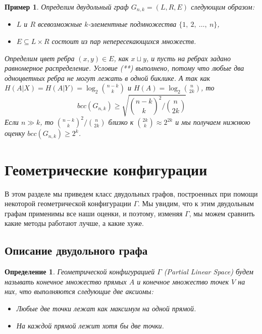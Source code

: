 \documentclass[a4paper]{article}
\newtheorem*{mdefinition}{Определение}
\newtheorem*{mexample}{Пример}
\begin{document}
\begin{mexample}
    Определим двудольный граф $G_{n,k} = (L, R, E)$ следующим образом: 
    \begin{itemize}[noitemsep]
        \item $L$ и $R$ всевозможные $k$-элементные подмножества $\{1,\ 2,\ \ldots,\ n\}$,
        \item $E\subseteq L\times R$ состоит из пар непересекающихся множеств.
    \end{itemize}
    Определим цвет ребра $(x, y)\in E$, как $x\sqcup y$, и пусть на ребрах задано равномерное распределение.
    Условие (**) выполнено, потому что любые два одноцветных ребра не могут лежать в одной биклике. А так как 
    $H(A|X) = H(A|Y) = \log_2\binom{n-k}{k}$ и $H(A) = \log_2\binom{n}{2k}$, то $$bcc(G_{n,k}) \geq 
    \sqrt{\binom{n-k}{k}^2 / \binom{n}{2k}}$$
    Если $n \gg k$, то $\binom{n-k}{k}^2 / \binom{n}{2k}$ близко к $\binom{2k}{k}\approx 2^{2k}$ и мы 
    получаем нижнюю оценку $bcc(G_{n,k})\geq 2^k$.
\end{mexample}

\setcounter{mclaim}{0}
\setcounter{mlemma}{0}
\setcounter{mtheorem}{0}
\addtocounter{section}{1}
\section*{Геометрические конфигурации}
В этом разделе мы приведем класс двудольных графов, построенных при помощи некоторой геометрической 
конфигурации $\Gamma$. Мы увидим, что к этим двудольным графам применимы все наши оценки, и поэтому, 
изменяя $\Gamma$, мы можем сравнить какие методы работают лучше, а какие хуже.

\setcounter{subsection}{0}
\subsection{Описание двудольного графа}
\begin{mdefinition}
    Геометрической конфигурацией $\Gamma$ (Partial Linear Space) будем называть конечное множество 
    прямых $A$ и конечное множество точек $V$ на них, что выполняются следующие две аксиомы:
    \begin{itemize}[noitemsep]
        \item Любые две точки лежат как максимум на одной прямой.
        \item На каждой прямой лежит хотя бы две точки.
    \end{itemize}
\end{mdefinition}
\end{document}
